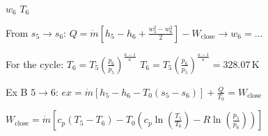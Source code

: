 \( w_6 \)  
\( T_6 \)  

From \( s_5 \to s_6 \):  
\( Q = \dot{m} \left[ h_5 - h_6 + \frac{w_5^2 - w_6^2}{2} \right] - W_{\text{close}} \rightarrow w_6 = \dots \)  

For the cycle:  
\( T_6 = T_5 \left( \frac{p_6}{p_5} \right)^{\frac{\kappa - 1}{\kappa}} \)  
\( T_6 = T_5 \left( \frac{p_6}{p_5} \right)^{\frac{\kappa - 1}{\kappa}} = 328.07 \, \text{K} \)  

Ex B \( 5 \to 6 \):  
\( ex = \dot{m} \left[ h_5 - h_6 - T_0 (s_5 - s_6) \right] + \frac{\dot{Q}}{T_0} = W_{\text{close}} \)  

\( W_{\text{close}} = \dot{m} \left[ c_p (T_5 - T_6) - T_0 \left( c_p \ln \left( \frac{T_5}{T_6} \right) - R \ln \left( \frac{p_5}{p_6} \right) \right) \right] \)